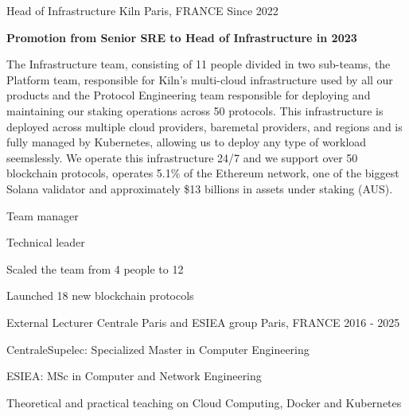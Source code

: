 

\begin{cventries}
\cventry
    {Head of Infrastructure} %
    {Kiln} %
    {Paris, FRANCE} %
    {Since 2022} %
    {
      \begin{cvitems} %
      \item {\textbf{Promotion from Senior SRE to Head of Infrastructure in 2023}}
      \item {The Infrastructure team, consisting of 11 people divided in two
        sub-teams, the Platform team, responsible for Kiln's multi-cloud infrastructure
          used by all our products and the Protocol Engineering team
          responsible for deploying and maintaining our staking operations across 50
          protocols. This infrastructure is deployed across multiple cloud
          providers, baremetal providers, and
          regions and is fully managed by Kubernetes, allowing us to deploy any
          type of workload seemslessly. We operate this infrastructure 24/7 and
          we support over 50 blockchain protocols,
          operates 5.1\% of the Ethereum network, one of the biggest Solana
          validator and approximately \$13
          billions in assets under staking (AUS).}
        \item {Team manager}
        \item {Technical leader}
        \item {Scaled the team from 4 people to 12}
        \item {Launched 18 new blockchain protocols}
      \end{cvitems}
    }
\vspace{0.5cm}

  \cventry
    {External Lecturer} %
    {Centrale Paris and ESIEA group}
    {Paris, FRANCE} %
    {2016 - 2025} %
    {
      \begin{cvitems} %
        \item {CentraleSupelec: Specialized Master in Computer Engineering}
        \item {ESIEA: MSc in Computer and Network Engineering}
        \item {Theoretical and practical teaching on Cloud Computing, Docker
          and Kubernetes}
      \end{cvitems}
    }
\vspace{0.5cm}


\end{cventries}
